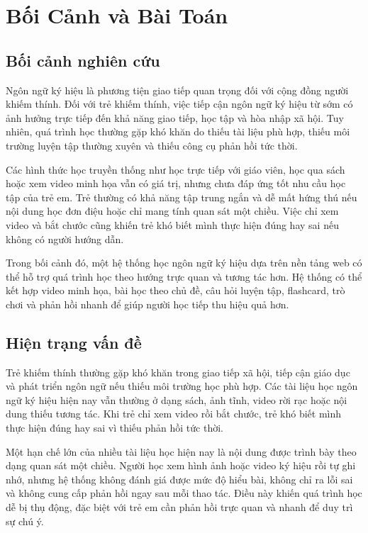 \documentclass[conference]{IEEEtran}
\begin{document}
\section{Bối Cảnh và Bài Toán}
\subsection{Bối cảnh nghiên cứu}
Ngôn ngữ ký hiệu là phương tiện giao tiếp quan trọng đối với cộng đồng người khiếm thính. Đối với trẻ khiếm thính, việc tiếp cận ngôn ngữ ký hiệu từ sớm có ảnh hưởng trực tiếp đến khả năng giao tiếp, học tập và hòa nhập xã hội. Tuy nhiên, quá trình học thường gặp khó khăn do thiếu tài liệu phù hợp, thiếu môi trường luyện tập thường xuyên và thiếu công cụ phản hồi tức thời.

Các hình thức học truyền thống như học trực tiếp với giáo viên, học qua sách hoặc xem video minh họa vẫn có giá trị, nhưng chưa đáp ứng tốt nhu cầu học tập của trẻ em. Trẻ thường có khả năng tập trung ngắn và dễ mất hứng thú nếu nội dung học đơn điệu hoặc chỉ mang tính quan sát một chiều. Việc chỉ xem video và bắt chước cũng khiến trẻ khó biết mình thực hiện đúng hay sai nếu không có người hướng dẫn.

Trong bối cảnh đó, một hệ thống học ngôn ngữ ký hiệu dựa trên nền tảng web có thể hỗ trợ quá trình học theo hướng trực quan và tương tác hơn. Hệ thống có thể kết hợp video minh họa, bài học theo chủ đề, câu hỏi luyện tập, flashcard, trò chơi và phản hồi nhanh để giúp người học tiếp thu hiệu quả hơn.

\subsection{Hiện trạng vấn đề}
Trẻ khiếm thính thường gặp khó khăn trong giao tiếp xã hội, tiếp cận giáo dục và phát triển ngôn ngữ nếu thiếu môi trường học phù hợp. Các tài liệu học ngôn ngữ ký hiệu hiện nay vẫn thường ở dạng sách, ảnh tĩnh, video rời rạc hoặc nội dung thiếu tương tác. Khi trẻ chỉ xem video rồi bắt chước, trẻ khó biết mình thực hiện đúng hay sai vì thiếu phản hồi tức thời.

Một hạn chế lớn của nhiều tài liệu học hiện nay là nội dung được trình bày theo dạng quan sát một chiều. Người học xem hình ảnh hoặc video ký hiệu rồi tự ghi nhớ, nhưng hệ thống không đánh giá được mức độ hiểu bài, không chỉ ra lỗi sai và không cung cấp phản hồi ngay sau mỗi thao tác. Điều này khiến quá trình học dễ bị thụ động, đặc biệt với trẻ em cần phản hồi trực quan và nhanh để duy trì sự chú ý.
\end{document}
